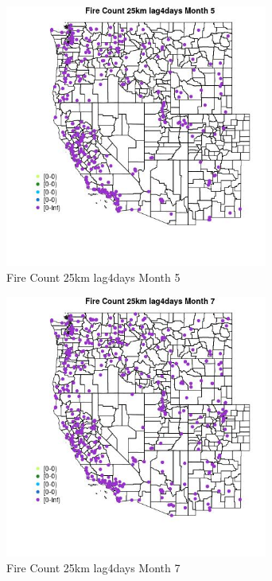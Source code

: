 \begin{figure} 
\centering  
\includegraphics[width=0.77\textwidth]{Code_Outputs/Report_ML_input_PM25_Step4_part_e_de_duplicated_aves_compiled_2019-05-18wNAs_MapObsMo5Fire_Count_25km_lag4days.jpg} 
\caption{\label{fig:Report_ML_input_PM25_Step4_part_e_de_duplicated_aves_compiled_2019-05-18wNAsMapObsMo5Fire_Count_25km_lag4days}Fire Count 25km lag4days Month 5} 
\end{figure} 
 

\begin{figure} 
\centering  
\includegraphics[width=0.77\textwidth]{Code_Outputs/Report_ML_input_PM25_Step4_part_e_de_duplicated_aves_compiled_2019-05-18wNAs_MapObsMo7Fire_Count_25km_lag4days.jpg} 
\caption{\label{fig:Report_ML_input_PM25_Step4_part_e_de_duplicated_aves_compiled_2019-05-18wNAsMapObsMo7Fire_Count_25km_lag4days}Fire Count 25km lag4days Month 7} 
\end{figure} 
 

